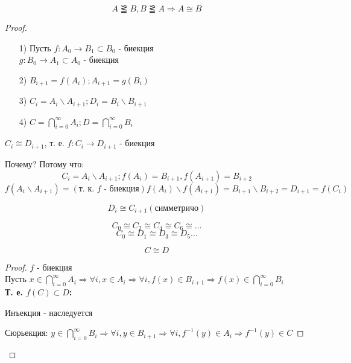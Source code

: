 \begin{theorem} 
\[
A \simlE B, B \simlE A \Rightarrow A \cong B 
\]
\end{theorem}
\begin{proof}
\begin{itemize}
  \item [1) ] Пусть $f: A_0 \rightarrow B_1 \subset B_0$ - биекция \\ $g: B_0 \rightarrow A_1 \subset A_0$ - биекция
  \item [2) ] $B_{i + 1} = f\left(A_i\right); A_{i + 1} = g\left(B_i\right)$
  \item [3) ] $C_i = A_i \backslash A_{i + 1}; D_i = B_i \backslash B_{i + 1}$
  \item [4) ] $C = \bigcap_{i = 0}^{\infty} A_i; D = \bigcap_{i = 0}^{\infty} B_i$
\end{itemize}
\begin{statement}
  $C_i \cong D_{i + 1}$, т. е. $f: C_i \rightarrow D_{i + 1}$ - биекция

  Почему? Потому что:
  \[
  C_i = A_i \backslash A_{i + 1}; f\left(A_i\right) = B_{i + 1}, f\left(A_{i + 1}\right) = B_{i + 2}
  \]
  \[
  f\left(A_i \backslash A_{i + 1}\right) =\left(\text{т. к. $f$ - биекция}\right) f\left(A_i\right) \backslash f\left(A_{i + 1}\right) = B_{i + 1} \backslash B_{i + 2} = D_{i + 1} = f\left(C_i\right)
  \]
\end{statement}
\begin{statement}
\[
D_i \cong C_{i + 1} \left(\text{симметричо}\right)
\]
\end{statement}
\begin{consequence}
\[
C_0 \cong C_2 \cong C_4 \cong C_6 \cong \ldots 
\]
\[
C_0 \cong D_1 \cong D_3 \cong D_5 \ldots 
\]
\end{consequence}
\begin{statement}
\[
C \cong D
\]
\begin{proof}
$f$ - биекция \\ Пусть $x \in \bigcap_{i = 0}^{\infty} A_i \Rightarrow \forall i, x \in A_i \Rightarrow \forall i, f\left(x\right) \in B_{i + 1} \Rightarrow f\left(x\right) \in \bigcap_{i = 0}^{\infty} B_i$ \\
\textbf{Т. е. $f\left(C\right) \subset D$:}

Инъекция - наследуется

Сюрьекция: $y \in \bigcap_{i = 0}^{\infty}B_i \Rightarrow \forall i, y \in B_{i + 1} \Rightarrow \forall i, f^{-1}\left(y\right) \in A_i \Rightarrow f^{-1}\left(y\right) \in C$
\end{proof}


\end{statement}
\end{proof}
